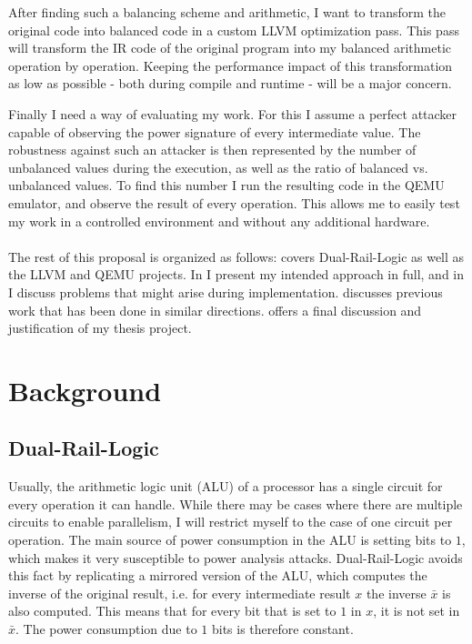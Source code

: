 \documentclass{article}
\newcommand{\qemu}{QEMU}
\newcommand{\dual}{Dual-Rail-Logic}
\newcommand{\llvm}{LLVM}
\newcommand{\exposee}{proposal}
\begin{document}
After finding such a balancing scheme and arithmetic, I want to transform the original code into balanced code in a custom \llvm{} optimization pass.
This pass will transform the IR code of the original program into my balanced arithmetic operation by operation.
Keeping the performance impact of this transformation as low as possible - both during compile and runtime - will be a major concern.

Finally I need a way of evaluating my work.
For this I assume a perfect attacker capable of observing the power signature of every intermediate value.
The robustness against such an attacker is then represented by the number of unbalanced values during the execution, as well as the ratio of balanced vs. unbalanced values.
To find this number I run the resulting code in the \qemu{} emulator, and observe the result of every operation.
This allows me to easily test my work in a controlled environment and without any additional hardware.
\\
\\
The rest of this \exposee{} is organized as follows:
 covers \dual{} as well as the \llvm{} and \qemu{} projects.
In  I present my intended approach in full, and in  I discuss problems that might arise during implementation.
 discusses previous work that has been done in similar directions.
 offers a final discussion and justification of my thesis project.

\section{Background}
\label{sec:background}
\subsection{\dual{}}
Usually, the arithmetic logic unit (ALU) of a processor has a single circuit for every operation it can handle.
While there may be cases where there are multiple circuits to enable parallelism, I will restrict myself to the case of one circuit per operation.
The main source of power consumption in the ALU is setting bits to $1$, which makes it very susceptible to power analysis attacks.
\dual{} avoids this fact by replicating a mirrored version of the ALU, which computes the inverse of the original result, i.e. for every intermediate result $x$ the inverse $\bar{x}$ is also computed.
This means that for every bit that is set to $1$ in $x$, it is not set in $\bar{x}$.
The power consumption due to $1$ bits is therefore constant.
\end{document}
